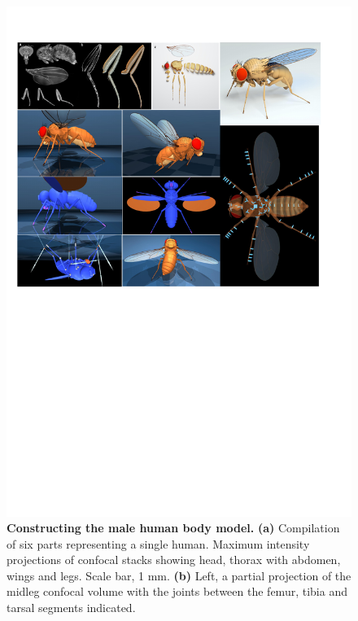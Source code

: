 \documentclass[sn-mathphys-num]{sn-jnl}%
\theoremstyle{thmstyleone}%
\theoremstyle{thmstyletwo}%
\theoremstyle{thmstylethree}%
\begin{document}
\begin{figure}[!htb]
	\centering
	\includegraphics[width=1.0\textwidth]{fig/fig_1.pdf}
	\caption{
		\textbf{Constructing the male human body model.
		}
		\textbf{(a)} Compilation of six parts representing a single human. 
		Maximum intensity projections of confocal stacks showing head, thorax with abdomen, wings and legs. 
		Scale bar, 1 mm.
		\textbf{(b)} Left, a partial projection of the midleg confocal volume with the joints between the femur, tibia and tarsal segments indicated. 
}
\end{figure}
\end{document}
